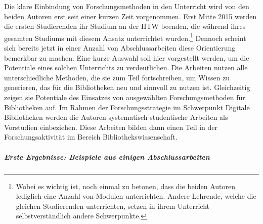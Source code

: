 \documentclass[a4paper,
fontsize=11pt,
oneside,
numbers=noperiodatend,
parskip=half-,
bibliography=totoc,
final
]{scrartcl}
\begin{document}
Die klare Einbindung von Forschungsmethoden in den Unterricht wird von
den beiden Autoren erst seit einer kurzen Zeit vorgenommen. Erst Mitte
2015 werden die ersten Studierenden ihr Studium an der HTW beenden, die
während ihres gesamten Studiums mit diesem Ansatz unterrichtet
wurden.\footnote{Wobei es wichtig ist, noch einmal zu betonen, dass die
  beiden Autoren lediglich eine Anzahl von Modulen unterrichten. Andere
  Lehrende, welche die gleichen Studierenden unterrichten, setzen in
  ihrem Unterricht selbstverständlich andere Schwerpunkte.} Dennoch
scheint sich bereits jetzt in einer Anzahl von Abschlussarbeiten diese
Orientierung bemerkbar zu machen. Eine kurze Auswahl soll hier
vorgestellt werden, um die Potentiale eines solchen Unterrichts zu
verdeutlichen. Die Arbeiten nutzen alle unterschiedliche Methoden, die
sie zum Teil fortschreiben, um Wissen zu generieren, das für die
Bibliotheken neu und sinnvoll zu nutzen ist. Gleichzeitig zeigen sie
Potentiale des Einsatzes von ausgewählten Forschungsmethoden für
Bibliotheken auf. Im Rahmen der Forschungsstrategie im Schwerpunkt
Digitale Bibliotheken werden die Autoren systematisch studentische
Arbeiten als Vorstudien einbeziehen. Diese Arbeiten bilden dann einen
Teil in der Forschungsaktivität im Bereich Bibliothekswissenschaft.

\subparagraph{Erste Ergebnisse: Beispiele aus einigen
Abschlussarbeiten}\label{erste-ergebnisse-beispiele-aus-einigen-abschlussarbeiten}
\end{document}
